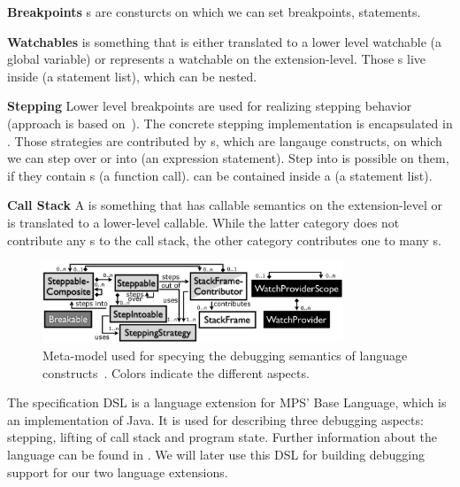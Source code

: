 \noindent \textbf{Breakpoints} s are consturcts on which we can
set breakpoints, \eg statements.

\noindent \textbf{Watchables}  is something that is either
translated to a lower level watchable (\eg a global variable) or represents a watchable on the
extension-level.
Those s live inside  (\eg a
statement list), which can be nested. 

\noindent \textbf{Stepping} Lower level breakpoints are used for realizing
stepping behavior (approach is based on~\cite{Wu06grammar}). The concrete
stepping implementation is encapsulated in . Those strategies are
contributed by s, which are langauge constructs,
on which we can step over or into (\eg an expression statement). 
Step into is possible on them, if they contain s
(\eg a function call).  can be contained inside a
 (\eg a statement list).

\noindent \textbf{Call Stack} A  is
something that has callable semantics on the extension-level or is
translated to a lower-level callable. While the latter category does not
contribute any s to the call stack, the other category
contributes one to many s.

\begin{figure}[h]
  \vspace{-2mm}
  \centering
    \includegraphics[width=9cm]{./figures/debugger-concepts.png} 
    \vspace{-2mm}
    \caption{Meta-model used for specying the debugging semantics of language
    constructs~\cite{DBLP:conf/adaEurope/AdaEuropeDeb}. Colors indicate the
    different aspects.} 
  \label{specabs}
  \vspace{-2mm}
\end{figure}

The specification \ac{DSL} is a language extension for MPS' Base Language,
which is an implementation of Java. It is used for describing three
debugging aspects: stepping, lifting of call stack and program state. Further
information about the language can be found in
\cite{DBLP:conf/adaEurope/AdaEuropeDeb}. We will later use this \ac{DSL} for
building debugging support for our two language extensions. 


